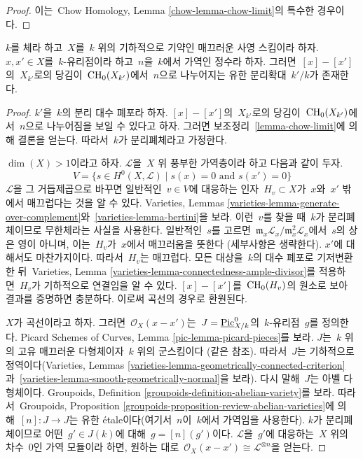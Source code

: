 \begin{proof}
이는\  Chow Homology, Lemma \ref{chow-lemma-chow-limit}의 특수한 경우이다.
\end{proof}

\begin{lemma}
\label{lemma-divide-difference-points}
$k$를 체라 하고\  $X$를\  $k$ 위의 기하적으로 기약인 매끄러운 사영
스킴이라 하자. $x, x' \in X$를\  $k$-유리점이라 하고\  $n$을\  $k$에서
가역인 정수라 하자. 그러면\  $[x] - [x']$의\  $X_{k'}$로의 당김이\ 
$\mathop{\mathrm{CH}}\nolimits_0(X_{k'})$에서\  $n$으로 나누어지는 유한 분리확대\  $k'/k$가 존재한다.
\end{lemma}

\begin{proof}
$k'$을\  $k$의 분리 대수 폐포라 하자. $[x] - [x']$의\  $X_{k'}$로의
당김이\  $\mathop{\mathrm{CH}}\nolimits_0(X_{k'})$에서\  $n$으로 나누어짐을 보일 수 있다고 하자.
그러면 보조정리\  \ref{lemma-chow-limit}에 의해 결론을 얻는다.
따라서\  $k$가 분리폐체라고 가정한다.

\medskip\noindent
$\dim(X) > 1$이라고 하자. $\mathcal{L}$을\  $X$ 위 풍부한 가역층이라 하고
다음과 같이 두자.
$$
V = \{s \in H^0(X, \mathcal{L}) \mid s(x) = 0\text{ and }s(x') = 0 \}
$$
$\mathcal{L}$을 그 거듭제곱으로 바꾸면 일반적인\  $v \in V$에 대응하는
인자\  $H_v \subset X$가\  $x$와\  $x'$ 밖에서 매끄럽다는 것을 알 수 있다.
Varieties, Lemmas \ref{varieties-lemma-generate-over-complement}와\ 
\ref{varieties-lemma-bertini}을 보라. 이런\  $v$를 찾을 때\  $k$가
분리폐체이므로 무한체라는 사실을 사용한다. 일반적인\  $s$를 고르면\ 
$\mathfrak m_x\mathcal{L}_x/\mathfrak m_x^2\mathcal{L}_x$에서\  $s$의
상은 영이 아니며, 이는\  $H_v$가\  $x$에서 매끄러움을 뜻한다
(세부사항은 생략한다). $x'$에 대해서도 마찬가지이다. 따라서\  $H_v$는
매끄럽다. 모든 대상을\  $k$의 대수 폐포로 기저변환한 뒤\  Varieties,
Lemma \ref{varieties-lemma-connectedness-ample-divisor}를 적용하면\ 
$H_v$가 기하적으로 연결임을 알 수 있다. $[x] - [x']$를\ 
$\mathop{\mathrm{CH}}\nolimits_0(H_v)$의 원소로 보아 결과를 증명하면 충분하다. 이로써 곡선의
경우로 환원된다.

\medskip\noindent
$X$가 곡선이라고 하자. 그러면\  $\mathcal{O}_X(x - x')$는\ 
$J = \underline{\mathop{\mathrm{Pic}}\nolimits}^0_{X/k}$의\  $k$-유리점\  $g$를 정의한다.
Picard Schemes of Curves, Lemma \ref{pic-lemma-picard-pieces}를 보라.
$J$는\  $k$ 위의 고유 매끄러운 다형체이자\  $k$ 위의 군스킴이다
(같은 참조). 따라서\  $J$는 기하적으로 정역이다(Varieties, Lemmas
\ref{varieties-lemma-geometrically-connected-criterion}과\ 
\ref{varieties-lemma-smooth-geometrically-normal}을 보라).
다시 말해\  $J$는 아벨 다형체이다. Groupoids, Definition
\ref{groupoids-definition-abelian-variety}를 보라. 따라서\  Groupoids,
Proposition \ref{groupoids-proposition-review-abelian-varieties}에 의해\ 
$[n] : J \to J$는 유한 \'etale이다(여기서\  $n$이\  $k$에서 가역임을
사용한다). $k$가 분리폐체이므로 어떤\  $g' \in J(k)$에 대해\ 
$g = [n](g')$이다. $\mathcal{L}$을\  $g'$에 대응하는\  $X$ 위의 차수\ 
$0$인 가역 모듈이라 하면, 원하는 대로\ 
$\mathcal{O}_X(x - x') \cong \mathcal{L}^{\otimes n}$을 얻는다.
\end{proof}


